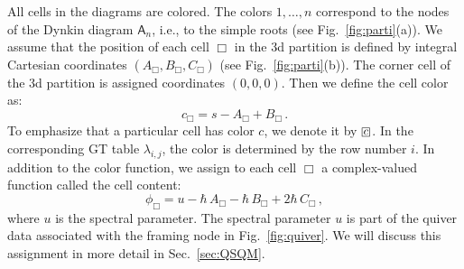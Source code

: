 \documentclass[10pt]{article}
\theoremstyle{definition}
\def\myA{{\mathsf{A}}}
\numberwithin{equation}{section}
\newcommand\sqbox[1]{{
		\setbox0=\hbox{\mbox{$\Box$}}
		\setbox1=\hbox{\mbox{\raisebox{0.35ex}{\small #1}}}
		\mbox{\raisebox{-0.2ex}{\rlap{\hbox to \wd0{\hss{\box1}\hss}}\box0}}
}}
\begin{document}
All cells in the diagrams are colored.
The colors $1,\ldots,n$ correspond to the nodes of  the Dynkin diagram $\myA_n$, i.e., to the simple roots (see Fig.~\ref{fig:parti}(a)).
We assume that the position of each cell $\Box$ in the 3d partition is defined by integral Cartesian coordinates $(A_{\Box},B_{\Box},C_{\Box})$ (see Fig.~\ref{fig:parti}(b)).
The corner cell of the 3d partition is assigned coordinates $(0,0,0)$.
Then we define the cell color as:
\begin{equation}
	c_{\Box}=s-A_{\Box}+B_{\Box}\,.
\end{equation}
To emphasize that a particular cell has color $c$, we denote it by $\sqbox{$c$}$.
In the corresponding GT table $\lambda_{i,j}$, the color is determined by the row number $i$.
In addition to the color function, we assign to each cell $\Box$ a complex-valued function called the cell content:
\begin{equation}\label{content}
	\phi_{\Box}=u-\hbar\, A_{\Box}-\hbar \, B_{\Box}+2\hbar\, C_{\Box}\,,
\end{equation}
where $u$ is the spectral parameter.
The spectral parameter $u$ is part of the quiver data associated with the framing node in Fig.~\ref{fig:quiver}.
We will discuss this assignment in more detail in Sec.~\ref{sec:QSQM}.
\end{document}
